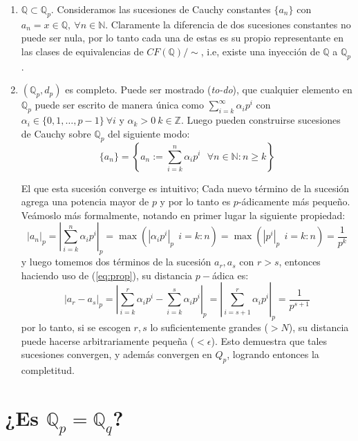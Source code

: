 \documentclass[spanish, fleqn]{article}
\begin{document}
\begin{enumerate}
    \item $\mathbb{Q} \subset \mathbb{Q}_p$. Consideramos las sucesiones de Cauchy constantes $\{a_n\}$ con $a_n = x \in \mathbb{Q},\  \forall n \in \mathbb{N}$. Claramente la diferencia de dos sucesiones constantes no puede ser nula, por lo tanto cada una de estas es su propio representante en las clases de equivalencias de $CF(\mathbb{Q})/\sim$, i.e, existe una inyección de $\mathbb{Q}$ a $\mathbb{Q}_p$.
    \item $(\mathbb{Q}_p, d_p)$ es completo. Puede ser mostrado (\textit{to-do}), que cualquier elemento en $\mathbb{Q}_p$ puede ser escrito de manera única como $ \displaystyle \sum_{i=k}^{\infty} \alpha_i p^{i} $
    con $\alpha_i \in \{0, 1, \ldots, p-1\} \ \forall i$ y $\alpha_k>0 \ k \in \mathbb{Z}$. Luego pueden construirse sucesiones de Cauchy sobre $\mathbb{Q}_p$ del siguiente modo:
    \begin{equation*}
        \{a_n\} = \left\{ a_n := \sum_{i=k}^n \alpha_i p^i \ \ \ \forall n \in \mathbb{N}: n\geq k  \right\}
    \end{equation*}

    El que esta sucesión converge es intuitivo; Cada nuevo término de la sucesión agrega una potencia mayor de $p$ y por lo tanto es $p$-ádicamente más pequeño. Veámoslo más formalmente, notando en primer lugar la siguiente propiedad:
    \begin{equation}
        |a_n|_p = \left| \sum_{i=k}^{n}\alpha_i p^i \right|_p = \max(|\alpha_i p^i|_p\ \ i=k:n) = \max(|p^i|_p\ \ i=k:n)=\frac{1}{p^k}
    \label{eq:prop}
    \end{equation}
    y luego tomemos dos términos de la sucesión $a_r, a_s$ con $r>s$, entonces haciendo uso de (\ref{eq:prop}), su distancia $p-$ádica es:
    \begin{equation}
        |a_r - a_s|_p = \left| \sum_{i=k}^{r}\alpha_i p^i - \sum_{i=k}^{s}\alpha_i p^i \right|_p = \left| \sum_{i=s+1}^{r}\alpha_i p^i \right|_p = \frac{1}{p^{s+1}}
    \end{equation}
    por lo tanto, si se escogen $r,s$ lo suficientemente grandes ($>N$), su distancia puede hacerse arbitrariamente pequeña ($<\epsilon$). Esto demuestra que tales sucesiones convergen, y además convergen en $Q_p$, logrando entonces la completitud.
\end{enumerate}

\section{¿Es $\mathbb{Q}_p = \mathbb{Q}_q$?}
\end{document}
